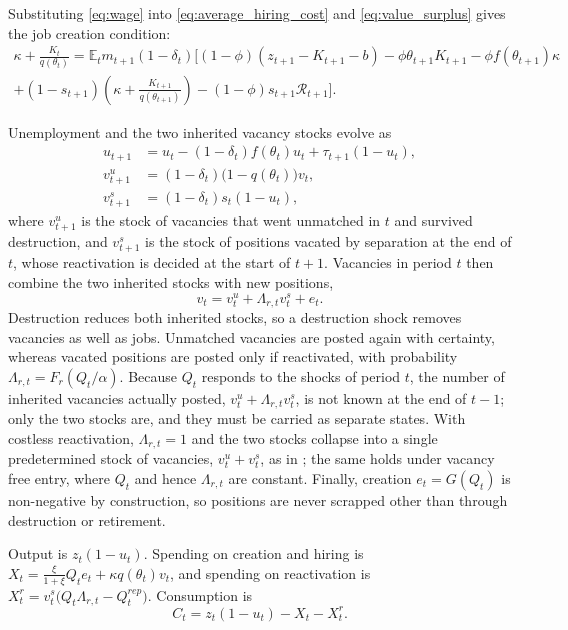 \documentclass[authoryear, review, 12pt]{elsarticle}
\newcommand{\E}{\mathbb{E}}
\begin{document}
Substituting \eqref{eq:wage} into \eqref{eq:average_hiring_cost} and \eqref{eq:value_surplus} gives the job creation condition:
\begin{multline}\label{eq:jcc}
\kappa+\frac{K_t}{q(\theta_t)} = \E_t m_{t+1}(1-\delta_t)\Big[(1-\phi)(z_{t+1}-K_{t+1}-b) - \phi\theta_{t+1}K_{t+1} - \phi f(\theta_{t+1})\kappa \\
+ (1-s_{t+1})\left(\kappa+\frac{K_{t+1}}{q(\theta_{t+1})}\right) - (1-\phi)s_{t+1}\mathcal{R}_{t+1}\Big].
\end{multline}

Unemployment and the two inherited vacancy stocks evolve as
\begin{align}
u_{t+1} &= u_t - (1-\delta_t)f(\theta_t)u_t + \tau_{t+1}(1-u_t), \label{eq:u_lom}\\
v^u_{t+1} &= (1-\delta_t)\big(1-q(\theta_t)\big)v_t, \label{eq:vu_lom}\\
v^s_{t+1} &= (1-\delta_t)s_t(1-u_t), \label{eq:vs_lom}
\end{align}
where $v^u_{t+1}$ is the stock of vacancies that went unmatched in $t$ and survived destruction, and $v^s_{t+1}$ is the stock of positions vacated by separation at the end of $t$, whose reactivation is decided at the start of $t+1$. Vacancies in period $t$ then combine the two inherited stocks with new positions,
\begin{equation}\label{eq:v_lom}
v_t = v^u_t + \Lambda_{r,t}v^s_t + e_t.
\end{equation}
Destruction reduces both inherited stocks, so a destruction shock removes vacancies as well as jobs. Unmatched vacancies are posted again with certainty, whereas vacated positions are posted only if reactivated, with probability $\Lambda_{r,t}=F_r(Q_t/\alpha)$. Because $Q_t$ responds to the shocks of period $t$, the number of inherited vacancies actually posted, $v^u_t+\Lambda_{r,t}v^s_t$, is not known at the end of $t-1$; only the two stocks are, and they must be carried as separate states. With costless reactivation, $\Lambda_{r,t}=1$ and the two stocks collapse into a single predetermined stock of vacancies, $v^u_t+v^s_t$, as in \citet{gabrovski_2025}; the same holds under vacancy free entry, where $Q_t$ and hence $\Lambda_{r,t}$ are constant. Finally, creation $e_t=G(Q_t)$ is non-negative by construction, so positions are never scrapped other than through destruction or retirement.

Output is $z_t(1-u_t)$. Spending on creation and hiring is $X_t = \frac{\xi}{1+\xi}Q_te_t + \kappa q(\theta_t)v_t$, and spending on reactivation is $X_t^r = v^s_t\big(Q_t\Lambda_{r,t}-Q_t^{rep}\big)$. Consumption is
\begin{equation}\label{eq:resources}
C_t = z_t(1-u_t) - X_t - X_t^r.
\end{equation}
\end{document}
